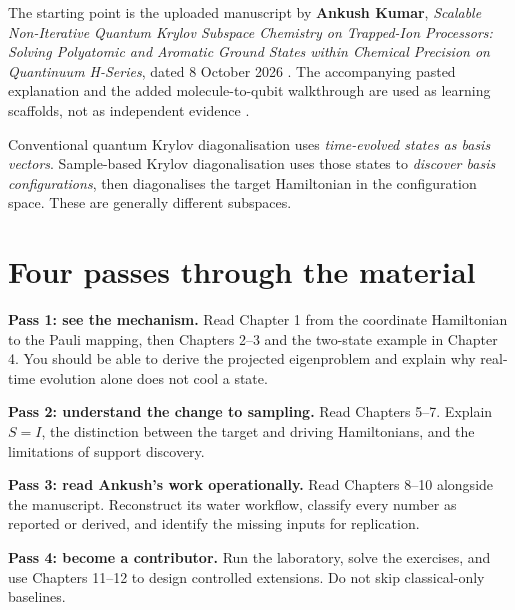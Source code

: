 \documentclass[11pt,a4paper,oneside]{report}
\begin{document}
The starting point is the uploaded manuscript by \textbf{Ankush Kumar}, \textit{Scalable Non-Iterative Quantum Krylov Subspace Chemistry on Trapped-Ion Processors: Solving Polyatomic and Aromatic Ground States within Chemical Precision on Quantinuum H-Series}, dated 8 October 2026 \cite{kumar}. The accompanying pasted explanation and the added molecule-to-qubit walkthrough are used as learning scaffolds, not as independent evidence \cite{pasted}.

\begin{idea}
Conventional quantum Krylov diagonalisation uses \emph{time-evolved states as basis vectors}. Sample-based Krylov diagonalisation uses those states to \emph{discover basis configurations}, then diagonalises the target Hamiltonian in the configuration space. These are generally different subspaces.
\end{idea}

\section*{Four passes through the material}
\textbf{Pass 1: see the mechanism.} Read Chapter 1 from the coordinate Hamiltonian to the Pauli mapping, then Chapters 2--3 and the two-state example in Chapter 4. You should be able to derive the projected eigenproblem and explain why real-time evolution alone does not cool a state.

\textbf{Pass 2: understand the change to sampling.} Read Chapters 5--7. Explain $S=I$, the distinction between the target and driving Hamiltonians, and the limitations of support discovery.

\textbf{Pass 3: read Ankush's work operationally.} Read Chapters 8--10 alongside the manuscript. Reconstruct its water workflow, classify every number as reported or derived, and identify the missing inputs for replication.

\textbf{Pass 4: become a contributor.} Run the laboratory, solve the exercises, and use Chapters 11--12 to design controlled extensions. Do not skip classical-only baselines.
\end{document}
